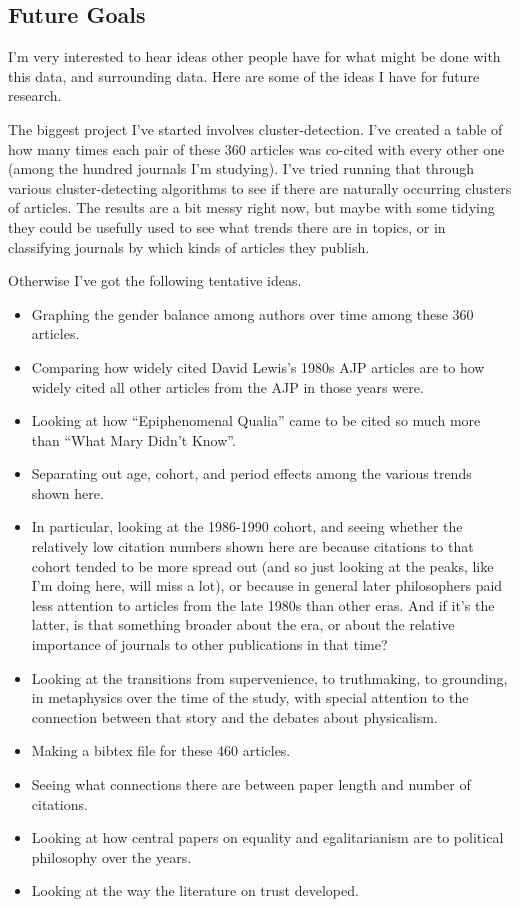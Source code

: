 \documentclass[
  10pt,
  letterpaper,
  DIV=11,
  numbers=noendperiod,
  twoside]{scrartcl}
\providecommand{\tightlist}{%
  \setlength{\itemsep}{0pt}\setlength{\parskip}{0pt}}\usepackage{longtable,booktabs,array}
\begin{document}
\subsection{Future Goals}\label{sec-future-goals}

I'm very interested to hear ideas other people have for what might be
done with this data, and surrounding data. Here are some of the ideas I
have for future research.

The biggest project I've started involves cluster-detection. I've
created a table of how many times each pair of these 360 articles was
co-cited with every other one (among the hundred journals I'm studying).
I've tried running that through various cluster-detecting algorithms to
see if there are naturally occurring clusters of articles. The results
are a bit messy right now, but maybe with some tidying they could be
usefully used to see what trends there are in topics, or in classifying
journals by which kinds of articles they publish.

Otherwise I've got the following tentative ideas.

\begin{itemize}
\tightlist
\item
  Graphing the gender balance among authors over time among these 360
  articles.
\item
  Comparing how widely cited David Lewis's 1980s AJP articles are to how
  widely cited all other articles from the AJP in those years were.
\item
  Looking at how ``Epiphenomenal Qualia'' came to be cited so much more
  than ``What Mary Didn't Know''.
\item
  Separating out age, cohort, and period effects among the various
  trends shown here.
\item
  In particular, looking at the 1986-1990 cohort, and seeing whether the
  relatively low citation numbers shown here are because citations to
  that cohort tended to be more spread out (and so just looking at the
  peaks, like I'm doing here, will miss a lot), or because in general
  later philosophers paid less attention to articles from the late 1980s
  than other eras. And if it's the latter, is that something broader
  about the era, or about the relative importance of journals to other
  publications in that time?
\item
  Looking at the transitions from supervenience, to truthmaking, to
  grounding, in metaphysics over the time of the study, with special
  attention to the connection between that story and the debates about
  physicalism.
\item
  Making a bibtex file for these 460 articles.
\item
  Seeing what connections there are between paper length and number of
  citations.
\item
  Looking at how central papers on equality and egalitarianism are to
  political philosophy over the years.
\item
  Looking at the way the literature on trust developed.
\end{itemize}
\end{document}
